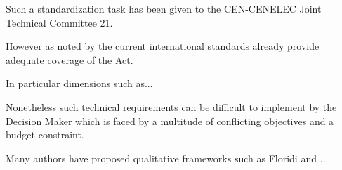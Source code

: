 Such a standardization task has been given to the CEN-CENELEC Joint Technical Committee 21.

However as noted by \cite{europeancommission.jointresearchcentre._2023a} the current international standards already provide adequate coverage of the Act.

In particular dimensions such as...

Nonetheless such technical requirements can be difficult to implement by the Decision Maker which is faced by a multitude of conflicting objectives and a budget constraint.

Many authors have proposed qualitative frameworks such as Floridi and ...